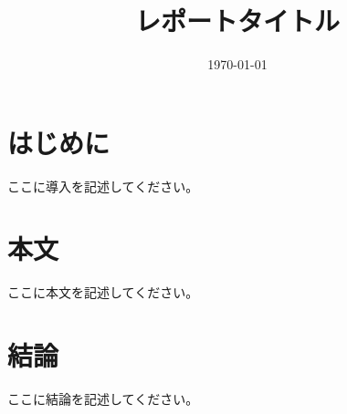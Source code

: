 \documentclass{report}
\title{レポートタイトル}
\author{}
\date{\today}
\begin{document}
\maketitle

\chapter{はじめに}
ここに導入を記述してください。

\chapter{本文}
ここに本文を記述してください。

\chapter{結論}
ここに結論を記述してください。
\end{document}
